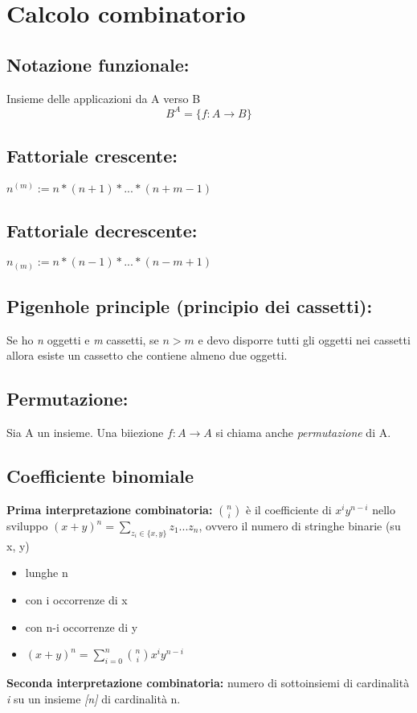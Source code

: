 \section{Calcolo combinatorio}

\subsection{Notazione funzionale:} Insieme delle applicazioni da A verso B
\[B^A=\{f:A\rightarrow B\}\]

\subsection{Fattoriale crescente:} \(n^{(m)}:= n\ast (n+1)\ast ... \ast (n+m-1)\)

\subsection{Fattoriale decrescente:} \(n_{(m)}:= n\ast (n-1)\ast ... \ast (n-m+1)\)

\subsection{Pigenhole principle (principio dei cassetti):} Se ho \textit{n} oggetti e \textit{m} cassetti, se \(n>m\) e devo disporre tutti gli oggetti nei cassetti allora esiste un cassetto che contiene almeno due oggetti.

\subsection{Permutazione:} Sia A un insieme. Una biiezione \(f:A\rightarrow A\) si chiama anche \textit{permutazione} di A.
\subsection{Coefficiente binomiale}
\textbf{Prima interpretazione combinatoria:} \(\binom{n}{i}\) è il coefficiente di \(x^i y^{n-i}\) nello sviluppo \((x+y)^n=\sum _{z_i\in \{x,y\}} z_1 ...z_n\), ovvero il numero di stringhe binarie (su {x, y})
\begin{itemize}
    \item lunghe n
    \item con i occorrenze di x
    \item con n-i occorrenze di y
    \item \((x+y)^n =\sum _{i=0} ^n\binom{n}{i} x^iy^{n-i}\)
\end{itemize}
\noindent\textbf{Seconda interpretazione combinatoria:} numero di sottoinsiemi di cardinalità \textit{i} su un insieme \textit{[n]} di cardinalità n.

